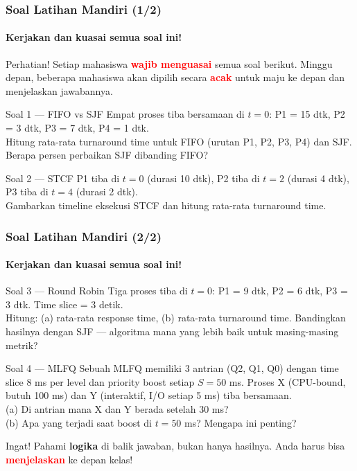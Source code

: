 \documentclass[t,aspectratio=169,xcolor=dvipsnames]{beamer}
\newcommand{\tem}[1]{\textbf{\textcolor{red}{#1}}}
\begin{document}
\begin{frame}
    \frametitle{Soal Latihan Mandiri (1/2)}
    \framesubtitle{Kerjakan dan kuasai semua soal ini!}
    \small
    \begin{alertblock}{Perhatian!}
        Setiap mahasiswa \tem{wajib menguasai} semua soal berikut. Minggu depan, beberapa mahasiswa akan dipilih secara \tem{acak} untuk maju ke depan dan menjelaskan jawabannya.
    \end{alertblock}

    \vspace{0.1cm}
    \begin{block}{Soal 1 --- FIFO vs SJF}
        Empat proses tiba bersamaan di $t=0$: P1 = 15 dtk, P2 = 3 dtk, P3 = 7 dtk, P4 = 1 dtk.\\
        Hitung rata-rata turnaround time untuk FIFO (urutan P1, P2, P3, P4) dan SJF. Berapa persen perbaikan SJF dibanding FIFO?
    \end{block}

    \begin{block}{Soal 2 --- STCF}
        P1 tiba di $t=0$ (durasi 10 dtk), P2 tiba di $t=2$ (durasi 4 dtk), P3 tiba di $t=4$ (durasi 2 dtk).\\
        Gambarkan timeline eksekusi STCF dan hitung rata-rata turnaround time.
    \end{block}
\end{frame}

\begin{frame}
    \frametitle{Soal Latihan Mandiri (2/2)}
    \framesubtitle{Kerjakan dan kuasai semua soal ini!}
    \scriptsize
    \begin{block}{Soal 3 --- Round Robin}
        Tiga proses tiba di $t=0$: P1 = 9 dtk, P2 = 6 dtk, P3 = 3 dtk. Time slice = 3 detik.\\
        Hitung: (a) rata-rata response time, (b) rata-rata turnaround time. Bandingkan hasilnya dengan SJF --- algoritma mana yang lebih baik untuk masing-masing metrik?
    \end{block}

    \vspace{0.1cm}
    \begin{block}{Soal 4 --- MLFQ}
        Sebuah MLFQ memiliki 3 antrian (Q2, Q1, Q0) dengan time slice 8 ms per level dan priority boost setiap $S=50$ ms. Proses X (CPU-bound, butuh 100 ms) dan Y (interaktif, I/O setiap 5 ms) tiba bersamaan.\\
        (a) Di antrian mana X dan Y berada setelah 30 ms?\\
        (b) Apa yang terjadi saat boost di $t=50$ ms? Mengapa ini penting?
    \end{block}

    \begin{alertblock}{Ingat!}
        Pahami \textbf{logika} di balik jawaban, bukan hanya hasilnya. Anda harus bisa \tem{menjelaskan} ke depan kelas!
    \end{alertblock}
\end{frame}
\end{document}
